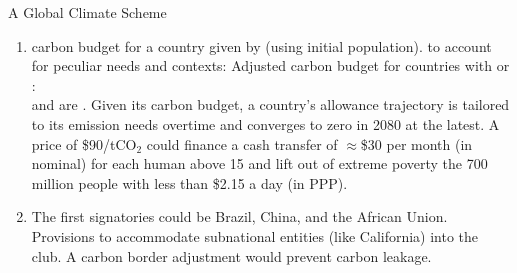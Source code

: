\documentclass[aspectratio=169,xcolor=dvipsnames, 11pt,mathserif]{beamer}
\begin{document}
\begin{frame}{A Global Climate Scheme\label{ffu} }
\begin{enumerate}[<+->]
        \bbvsp \ip A carbon market, with emissions permits auctioned to fossil fuel companies at the international level. %
        \ip Rule to guarantee that emissions permits decrease overtime and do not exceed emissions at start year.%
        \ee
        \item {}
        \bbvsp \ip {} carbon budget for a country given by  (using initial population).
        \ip {} to account for peculiar needs and contexts:
        \ip Adjusted carbon budget for countries with   or : 
        \\  and  are . \pause \pause
        \ip Given its carbon budget, a country's allowance trajectory is tailored to its emission needs overtime and converges to zero in 2080 at the latest.
        \ip A price of \$90/tCO$_\text{2}$ could finance a cash transfer of $\approx$\$30 per month (in nominal) for each human above 15 and lift out of extreme poverty the 700 million people with less than \$2.15 a day (in PPP).
        \ee
        \item {}
        \bbvsp \ip The first signatories could be Brazil, China, and the African Union.  \hyperlink{scenarios}{} %
        \ip Provisions to accommodate subnational entities (like California) into the club.
        \ip A carbon border adjustment would prevent carbon leakage. \ee 

    \end{enumerate}
\end{frame}
\end{document}
